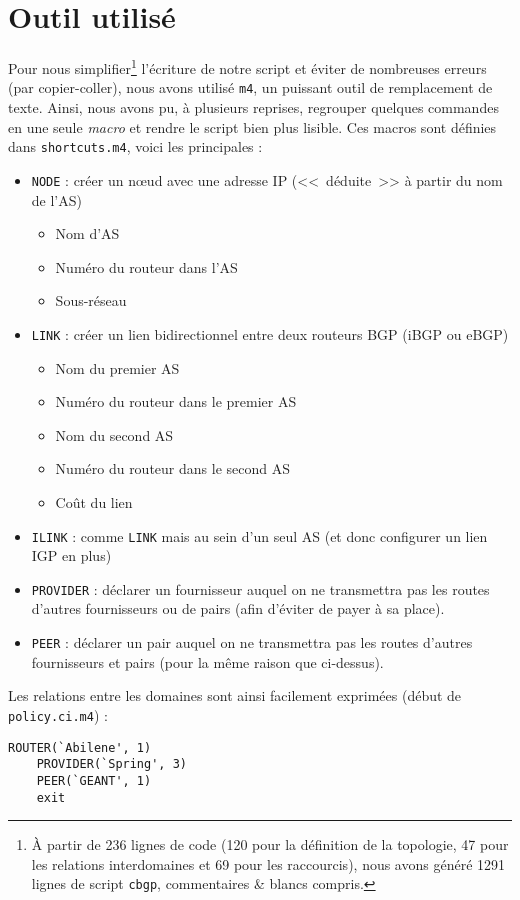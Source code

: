 \documentclass[10pt,a4paper,twocolumn]{article}
\begin{document}
\section{Outil utilisé}
Pour nous simplifier\footnote{À partir de 236 lignes de code (120 pour la définition de la topologie, 47 pour les relations interdomaines et 69 pour les raccourcis), nous avons généré 1291 lignes de script \texttt{cbgp}, commentaires \& blancs compris.} l'écriture de notre script et éviter de nombreuses erreurs (par copier-coller), nous avons utilisé \texttt{m4}, un puissant outil de remplacement de texte.
Ainsi, nous avons pu, à plusieurs reprises, regrouper quelques commandes en une seule \textit{macro} et rendre le script bien plus lisible. Ces macros sont définies dans \texttt{shortcuts.m4}, voici les principales :
\begin{itemize}
\item \texttt{NODE} : créer un nœud avec une adresse IP (<<~déduite~>> à partir du nom de l'AS)
	\begin{itemize}
		\item Nom d'AS
		\item Numéro du routeur dans l'AS
		\item Sous-réseau
	\end{itemize}
\item \texttt{LINK} : créer un lien bidirectionnel entre deux routeurs BGP (iBGP ou eBGP)
	\begin{itemize}
		\item Nom du premier AS
		\item Numéro du routeur dans le premier AS
		\item Nom du second AS
		\item Numéro du routeur dans le second AS
		\item Coût du lien
	\end{itemize}
\item \texttt{ILINK} : comme \texttt{LINK} mais au sein d'un seul AS (et donc configurer un lien IGP en plus)
\item \texttt{PROVIDER} : déclarer un fournisseur auquel on ne transmettra pas les routes d'autres fournisseurs ou de pairs (afin d'éviter de payer à sa place).
\item \texttt{PEER} : déclarer un pair auquel on ne transmettra pas les routes d'autres fournisseurs et pairs (pour la même raison que ci-dessus).
\end{itemize}

Les relations entre les domaines sont ainsi facilement exprimées (début de \texttt{policy.ci.m4}) :
\begin{verbatim}
ROUTER(`Abilene', 1)
    PROVIDER(`Spring', 3)
    PEER(`GEANT', 1)
    exit
\end{verbatim}
\end{document}
